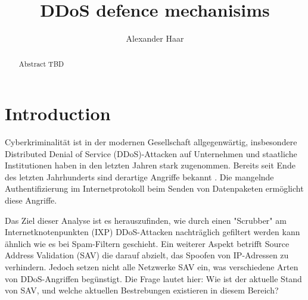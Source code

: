 \documentclass[sigplan,screen]{acmart}
\begin{document}
\title{DDoS defence mechanisims}

\author{Alexander Haar}

\begin{abstract}
  Abstract TBD
\end{abstract}



\maketitle

\section{Introduction}
Cyberkriminalität ist in der modernen Gesellschaft allgegenwärtig, insbesondere Distributed Denial of Service (DDoS)-Attacken auf Unternehmen und staatliche Institutionen haben in den letzten Jahren stark zugenommen. Bereits seit Ende des letzten Jahrhunderts sind derartige Angriffe bekannt \cite{manrs01}. Die mangelnde Authentifizierung im Internetprotokoll beim Senden von Datenpaketen ermöglicht diese Angriffe. 

Das Ziel dieser Analyse ist es herauszufinden, wie durch einen "Scrubber" am Internetknotenpunkten (IXP) DDoS-Attacken nachträglich gefiltert werden kann ähnlich wie es bei Spam-Filtern geschieht. Ein weiterer Aspekt betrifft Source Address Validation (SAV) die darauf abzielt, das Spoofen von IP-Adressen zu verhindern. Jedoch setzen nicht alle Netzwerke SAV ein, was verschiedene Arten von DDoS-Angriffen begünstigt. Die Frage lautet hier: Wie ist der aktuelle Stand von SAV, und welche aktuellen Bestrebungen existieren in diesem Bereich?
\end{document}

